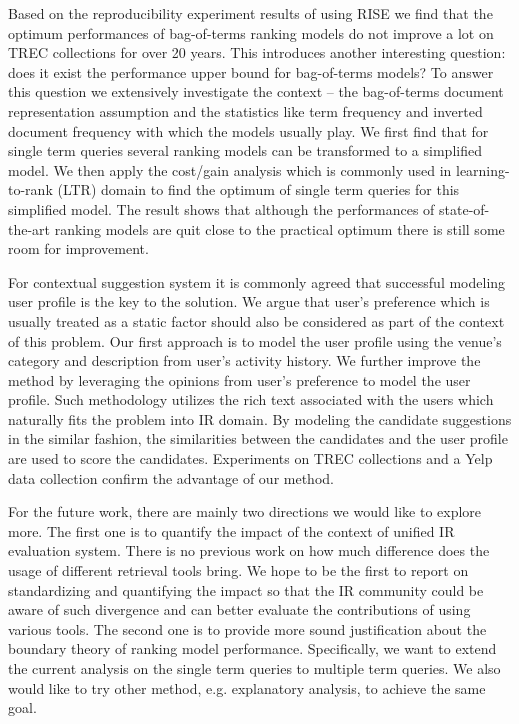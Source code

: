 Based on the reproducibility experiment results of using RISE we find that 
the optimum performances of bag-of-terms ranking models do not improve a lot 
on TREC collections for over 20 years. 
This introduces another interesting question: does it exist the performance 
upper bound for bag-of-terms models? To answer this question we extensively 
investigate the context -- the bag-of-terms document representation 
assumption and the statistics like term frequency and inverted document 
frequency with which the models usually play.
We first find that for single term queries several ranking models can be 
transformed to a simplified model. We then apply the cost/gain analysis which 
is commonly used in learning-to-rank (LTR) domain to find the optimum of 
single term queries for this simplified model.
The result shows that although the performances of state-of-the-art 
ranking models are quit close to the practical optimum there is still some 
room for improvement.

For contextual suggestion system it is commonly agreed that successful 
modeling user profile is the key to the solution. We argue that user's 
preference which is usually treated as a static factor should also be 
considered as part of the context of this problem. 
Our first approach is to model the user profile using the venue's category 
and description from user's activity history. We further improve the 
method by leveraging the opinions from user's preference to model the 
user profile. Such methodology utilizes the rich text associated 
with the users which naturally fits the problem into IR domain. 
By modeling the candidate suggestions in the similar fashion, 
the similarities between the candidates and the user profile are used to 
score the candidates. Experiments on TREC collections and a Yelp data 
collection confirm the advantage of our method.

For the future work, there are mainly two directions we would like to explore more. 
The first one is to quantify the impact of the context of unified 
IR evaluation system. There is no previous work on how much difference does 
the usage of different retrieval tools bring.
We hope to be the first to report on standardizing and quantifying the 
impact so that the IR community could be aware of such divergence and can 
better evaluate the contributions of using various tools. 
The second one is to provide more sound justification about the boundary 
theory of ranking model performance. Specifically, we want to extend the 
current analysis on the single term queries to multiple term queries. 
We also would like to try other method, e.g. explanatory analysis, 
to achieve the same goal.
